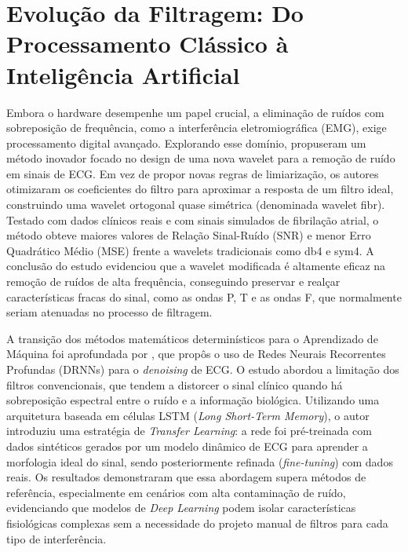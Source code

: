 \documentclass[tcc,capa]{texufpel}
\begin{document}
\section{Evolução da Filtragem: Do Processamento Clássico à Inteligência Artificial}

Embora o hardware desempenhe um papel crucial, a eliminação de ruídos com sobreposição de frequência, como a interferência eletromiográfica (EMG), exige processamento digital avançado. Explorando esse domínio, \cite{wang2019} propuseram um método inovador focado no design de uma nova wavelet para a remoção de ruído em sinais de ECG. Em vez de propor novas regras de limiarização, os autores otimizaram os coeficientes do filtro para aproximar a resposta de um filtro ideal, construindo uma wavelet ortogonal quase simétrica (denominada wavelet fibr). Testado com dados clínicos reais e com sinais simulados de fibrilação atrial, o método obteve maiores valores de Relação Sinal-Ruído (SNR) e menor Erro Quadrático Médio (MSE) frente a wavelets tradicionais como db4 e sym4. A conclusão do estudo evidenciou que a wavelet modificada é altamente eficaz na remoção de ruídos de alta frequência, conseguindo preservar e realçar características fracas do sinal, como as ondas P, T e as ondas F, que normalmente seriam atenuadas no processo de filtragem.

A transição dos métodos matemáticos determinísticos para o Aprendizado de Máquina foi aprofundada por \cite{antczak2018}, que propôs o uso de Redes Neurais Recorrentes Profundas (DRNNs) para o \textit{denoising} de ECG. O estudo abordou a limitação dos filtros convencionais, que tendem a distorcer o sinal clínico quando há sobreposição espectral entre o ruído e a informação biológica. Utilizando uma arquitetura baseada em células LSTM (\textit{Long Short-Term Memory}), o autor introduziu uma estratégia de \textit{Transfer Learning}: a rede foi pré-treinada com dados sintéticos gerados por um modelo dinâmico de ECG para aprender a morfologia ideal do sinal, sendo posteriormente refinada (\textit{fine-tuning}) com dados reais. Os resultados demonstraram que essa abordagem supera métodos de referência, especialmente em cenários com alta contaminação de ruído, evidenciando que modelos de \textit{Deep Learning} podem isolar características fisiológicas complexas sem a necessidade do projeto manual de filtros para cada tipo de interferência.
\end{document}
